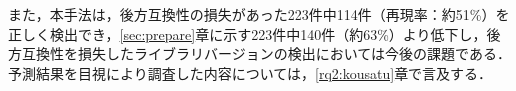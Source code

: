 \documentclass[submit]{ipsj}
\begin{document}
{また，本手法は，後方互換性の損失があった223件中114件（再現率：約51\%）を正しく検出でき，\ref{sec:prepare}章に示す223件中140件（約63\%）より低下し，後方互換性を損失したライブラリバージョンの検出においては今後の課題である．予測結果を目視により調査した内容については，\ref{rq2:kousatu}章で言及する．









}
\end{document}
